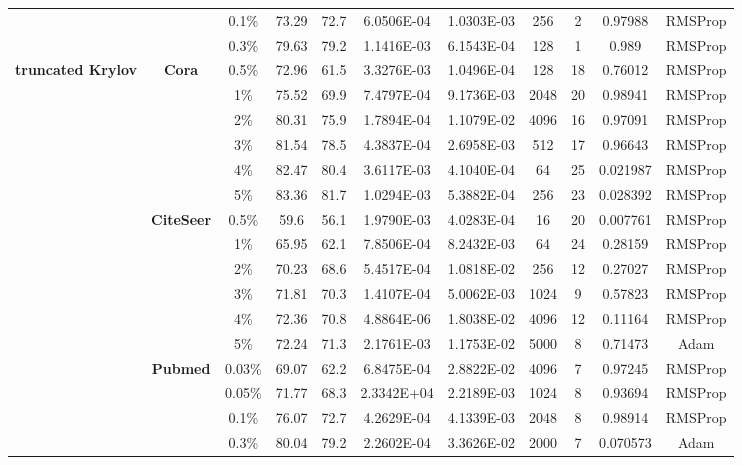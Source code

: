 \begin{table}[htbp]
\begin{tabular}{ccccc|cccccc}
          &       & 0.1\% & 73.29 & 72.7  & 6.0506E-04 & 1.0303E-03 & 256   & 2     & 0.97988 & RMSProp \\
          &       & 0.3\% & 79.63 & 79.2  & 1.1416E-03 & 6.1543E-04 & 128   & 1     & 0.989 & RMSProp \\
    \midrule
    \multirow{16}[2]{*}{\textbf{truncated Krylov}} & \multirow{6}[1]{*}{\textbf{Cora}} & 0.5\% & 72.96 & 61.5  & 3.3276E-03 & 1.0496E-04 & 128   & 18    & 0.76012 & RMSProp \\
          &       & 1\%   & 75.52 & 69.9  & 7.4797E-04 & 9.1736E-03 & 2048  & 20    & 0.98941 & RMSProp \\
          &       & 2\%   & 80.31 & 75.9  & 1.7894E-04 & 1.1079E-02 & 4096  & 16    & 0.97091 & RMSProp \\
          &       & 3\%   & 81.54 & 78.5  & 4.3837E-04 & 2.6958E-03 & 512   & 17    & 0.96643 & RMSProp \\
          &       & 4\%   & 82.47 & 80.4  & 3.6117E-03 & 4.1040E-04 & 64    & 25    & 0.021987 & RMSProp \\
          &       & 5\%   & 83.36 & 81.7  & 1.0294E-03 & 5.3882E-04 & 256   & 23    & 0.028392 & RMSProp \\
          & \multirow{6}[0]{*}{\textbf{CiteSeer}} & 0.5\% & 59.6  & 56.1  & 1.9790E-03 & 4.0283E-04 & 16    & 20    & 0.007761 & RMSProp \\
          &       & 1\%   & 65.95 & 62.1  & 7.8506E-04 & 8.2432E-03 & 64    & 24    & 0.28159 & RMSProp \\
          &       & 2\%   & 70.23 & 68.6  & 5.4517E-04 & 1.0818E-02 & 256   & 12    & 0.27027 & RMSProp \\
          &       & 3\%   & 71.81 & 70.3  & 1.4107E-04 & 5.0062E-03 & 1024  & 9     & 0.57823 & RMSProp \\
          &       & 4\%   & 72.36 & 70.8  & 4.8864E-06 & 1.8038E-02 & 4096  & 12    & 0.11164 & RMSProp \\
          &       & 5\%   & 72.24 & 71.3  & 2.1761E-03 & 1.1753E-02 & 5000  & 8     & 0.71473 & Adam \\
          & \multirow{4}[1]{*}{\textbf{Pubmed}} & 0.03\% & 69.07 & 62.2  & 6.8475E-04 & 2.8822E-02 & 4096  & 7     & 0.97245 & RMSProp \\
          &       & 0.05\% & 71.77 & 68.3  & 2.3342E+04 & 2.2189E-03 & 1024  & 8     & 0.93694 & RMSProp \\
          &       & 0.1\% & 76.07 & 72.7  & 4.2629E-04 & 4.1339E-03 & 2048  & 8     & 0.98914 & RMSProp \\
          &       & 0.3\% & 80.04 & 79.2  & 2.2602E-04 & 3.3626E-02 & 2000  & 7     & 0.070573 & Adam \\
    \bottomrule
    \bottomrule
    \end{tabular}%
  \label{tab:hyperparameters_without_validation}%
\end{table}%
